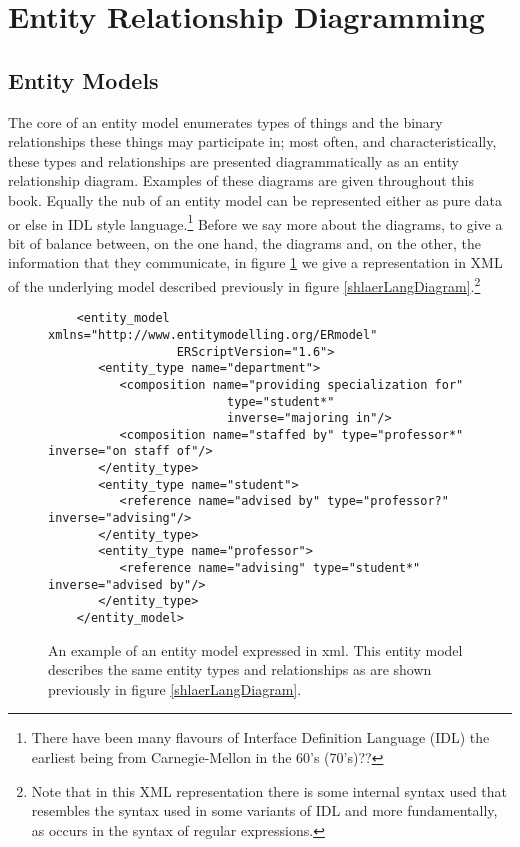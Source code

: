 \section{Entity Relationship Diagramming}
\label{EntityRelationshipDiagramming}

\subsection{Entity Models}

\mynote
{}
The core of an entity model enumerates types of things and the binary relationships these things may participate in; most often, and characteristically, these types and relationships are presented diagrammatically as an entity relationship diagram.
Examples of these diagrams are given  throughout this book.  
Equally the nub of an entity model can be represented either as pure data 
or else in IDL style language.\footnote{There have been many flavours of Interface Definition Language (IDL) the earliest being from Carnegie-Mellon in the 60's (70's)??} 
Before we say more about the diagrams, to give a bit of balance between, on the one hand, the diagrams and,
on the other, the information that they communicate, in figure \ref{shlaerlangModel} we give a representation in XML of the underlying model described previously in figure \ref{shlaerLangDiagram}.\footnote{Note that in this XML representation there is some internal syntax used that resembles the syntax used in some variants of IDL and more fundamentally, as occurs in the syntax of regular expressions.} 

\begin{figure}[h] %
\footnotesize\begin{verbatim}
	<entity_model xmlns="http://www.entitymodelling.org/ERmodel" 
	              ERScriptVersion="1.6">
	   <entity_type name="department">
	      <composition name="providing specialization for"
	                     type="student*"
	                     inverse="majoring in"/>
	      <composition name="staffed by" type="professor*" inverse="on staff of"/>
	   </entity_type>
	   <entity_type name="student">
	      <reference name="advised by" type="professor?" inverse="advising"/>
	   </entity_type>
	   <entity_type name="professor">
	      <reference name="advising" type="student*" inverse="advised by"/>
	   </entity_type>
	</entity_model>\end{verbatim}
\caption{An example of an entity model expressed in xml. 
This entity model describes the same entity types and relationships 
as are shown previously in figure \ref{shlaerLangDiagram}. }
\label{shlaerlangModel}
\end{figure}


